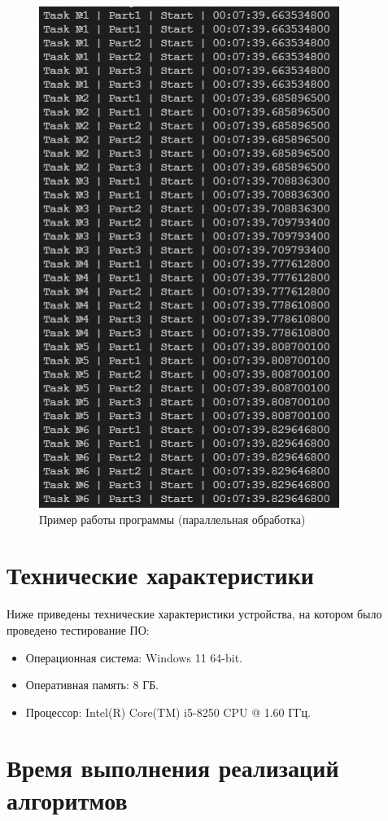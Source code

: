 \documentclass[12pt]{report}
\begin{document}
\begin{figure}[hp!]
	\centering
	\includegraphics[scale=1.3]{report_files/app_run.jpg}
	\caption{Пример работы программы (параллельная обработка)}
	\label{fig:conveyor}
\end{figure}
\newpage
\section{Технические характеристики}

Ниже приведены технические характеристики устройства, на котором было проведено тестирование ПО:

\begin{itemize}
	\item Операционная система: Windows 11 64-bit.
	\item Оперативная память: 8 ГБ.
	\item Процессор: Intel(R) Core(TM) i5-8250 CPU @ 1.60 ГГц.
\end{itemize}

\section{Время выполнения реализаций алгоритмов}
\end{document}
